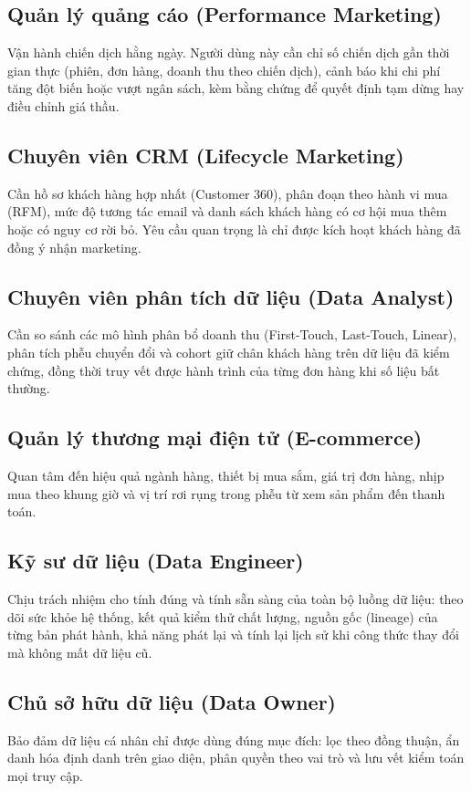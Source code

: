 \subsection{Quản lý quảng cáo (Performance Marketing)}
\label{sec:c1-sh-performance}
Vận hành chiến dịch hằng ngày. Người dùng này cần chỉ số chiến dịch gần thời gian thực (phiên, đơn hàng, doanh thu theo chiến dịch), cảnh báo khi chi phí tăng đột biến hoặc vượt ngân sách, kèm bằng chứng để quyết định tạm dừng hay điều chỉnh giá thầu.

\subsection{Chuyên viên CRM (Lifecycle Marketing)}
\label{sec:c1-sh-crm}
Cần hồ sơ khách hàng hợp nhất (Customer 360), phân đoạn theo hành vi mua (RFM), mức độ tương tác email và danh sách khách hàng có cơ hội mua thêm hoặc có nguy cơ rời bỏ. Yêu cầu quan trọng là chỉ được kích hoạt khách hàng đã đồng ý nhận marketing.

\subsection{Chuyên viên phân tích dữ liệu (Data Analyst)}
\label{sec:c1-sh-analyst}
Cần so sánh các mô hình phân bổ doanh thu (First-Touch, Last-Touch, Linear), phân tích phễu chuyển đổi và cohort giữ chân khách hàng trên dữ liệu đã kiểm chứng, đồng thời truy vết được hành trình của từng đơn hàng khi số liệu bất thường.

\subsection{Quản lý thương mại điện tử (E-commerce)}
\label{sec:c1-sh-product}
Quan tâm đến hiệu quả ngành hàng, thiết bị mua sắm, giá trị đơn hàng, nhịp mua theo khung giờ và vị trí rơi rụng trong phễu từ xem sản phẩm đến thanh toán.

\subsection{Kỹ sư dữ liệu (Data Engineer)}
\label{sec:c1-sh-engineer}
Chịu trách nhiệm cho tính đúng và tính sẵn sàng của toàn bộ luồng dữ liệu: theo dõi sức khỏe hệ thống, kết quả kiểm thử chất lượng, nguồn gốc (lineage) của từng bản phát hành, khả năng phát lại và tính lại lịch sử khi công thức thay đổi mà không mất dữ liệu cũ.

\subsection{Chủ sở hữu dữ liệu (Data Owner)}
\label{sec:c1-sh-privacy}
Bảo đảm dữ liệu cá nhân chỉ được dùng đúng mục đích: lọc theo đồng thuận, ẩn danh hóa định danh trên giao diện, phân quyền theo vai trò và lưu vết kiểm toán mọi truy cập.

